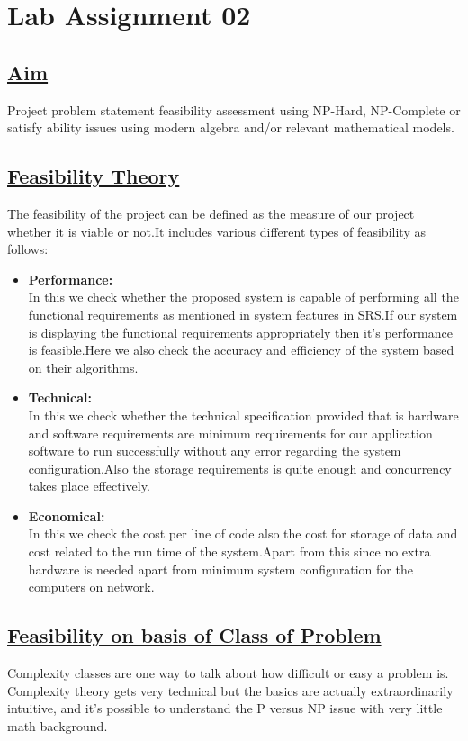 \section*{\centering\LARGE{Lab Assignment 02}}
\subsection*{\underline{Aim}}
Project problem statement feasibility assessment using NP-Hard, NP-Complete or satisfy ability issues using modern algebra and/or relevant mathematical models.

\subsection*{\underline{Feasibility Theory}}
The feasibility of the project can be defined as the measure of our project whether it is viable or not.It includes various different types of feasibility as follows:
\begin{itemize}
\item \textbf{Performance:}\\
In this we check whether the proposed system is capable of performing all the functional requirements as mentioned in system features in SRS.If our system is displaying the functional requirements appropriately then it's performance is feasible.Here we also check the accuracy and efficiency of the system based on their algorithms.
\item \textbf{Technical:}\\
In this we check whether the technical specification provided that is hardware and software requirements are minimum requirements for our application software to run successfully without any error regarding the system configuration.Also the  storage requirements is quite enough and concurrency takes place effectively.
\item \textbf{Economical:}\\
In this we check the cost per line of code also the cost for storage of data and cost related to the run time of the system.Apart from this since no extra hardware is needed apart from minimum system configuration for the computers on network.


\end{itemize}
\noindent
\subsection*{\underline{Feasibility on basis of Class of Problem}}
\hspace{5em}Complexity classes are one way to talk about how difficult or easy a problem is.
Complexity theory gets very technical but the basics are actually extraordinarily
intuitive, and it's possible to understand the P versus NP issue with very little
math background.\\

